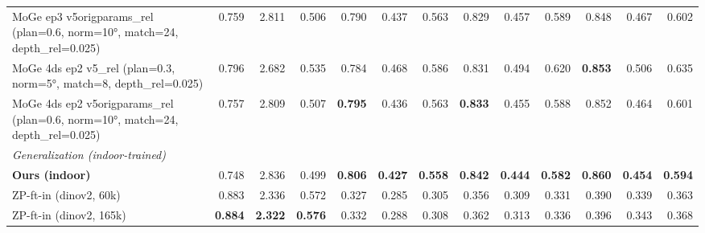 \begin{table}[t]
{\begin{tabular}{l r r r r r r r r r r r r}
MoGe ep3 v5origparams\_rel (plan=0.6, norm=10°, match=24, depth\_rel=0.025) & 0.759 & 2.811 & 0.506 & 0.790 & 0.437 & 0.563 & 0.829 & 0.457 & 0.589 & 0.848 & 0.467 & 0.602 \\
MoGe 4ds ep2 v5\_rel (plan=0.3, norm=5°, match=8, depth\_rel=0.025) & 0.796 & 2.682 & 0.535 & 0.784 & 0.468 & 0.586 & 0.831 & 0.494 & 0.620 & \textbf{0.853} & 0.506 & 0.635 \\
MoGe 4ds ep2 v5origparams\_rel (plan=0.6, norm=10°, match=24, depth\_rel=0.025) & 0.757 & 2.809 & 0.507 & \textbf{0.795} & 0.436 & 0.563 & \textbf{0.833} & 0.455 & 0.588 & 0.852 & 0.464 & 0.601 \\
\midrule
\multicolumn{13}{l}{\textit{Generalization (indoor-trained)}} \\
\textbf{Ours (indoor)} & 0.748 & 2.836 & 0.499 & \textbf{0.806} & \textbf{0.427} & \textbf{0.558} & \textbf{0.842} & \textbf{0.444} & \textbf{0.582} & \textbf{0.860} & \textbf{0.454} & \textbf{0.594} \\
ZP-ft-in (dinov2, 60k) & 0.883 & 2.336 & 0.572 & 0.327 & 0.285 & 0.305 & 0.356 & 0.309 & 0.331 & 0.390 & 0.339 & 0.363 \\
ZP-ft-in (dinov2, 165k) & \textbf{0.884} & \textbf{2.322} & \textbf{0.576} & 0.332 & 0.288 & 0.308 & 0.362 & 0.313 & 0.336 & 0.396 & 0.343 & 0.368 \\
\bottomrule
\end{tabular}%
}
\end{table}